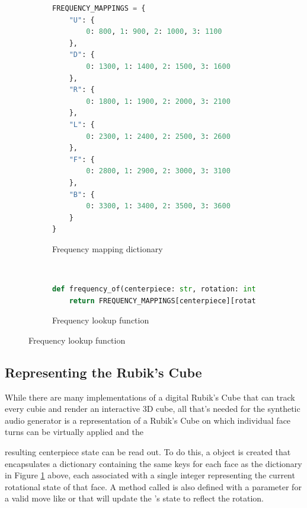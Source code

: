 \begin{figure}[h]
\caption{Centerpiece State to Frequency Mapping}
\begin{subfigure}{\textwidth}
\caption{Frequency mapping dictionary}
\label{fig:code-freq-mapping-dict}
\begin{lstlisting}[language=Python]
FREQUENCY_MAPPINGS = {
    "U": {
        0: 800, 1: 900, 2: 1000, 3: 1100
    },
    "D": {
        0: 1300, 1: 1400, 2: 1500, 3: 1600
    },
    "R": {
        0: 1800, 1: 1900, 2: 2000, 3: 2100
    },
    "L": {
        0: 2300, 1: 2400, 2: 2500, 3: 2600
    },
    "F": {
        0: 2800, 1: 2900, 2: 3000, 3: 3100
    },
    "B": {
        0: 3300, 1: 3400, 2: 3500, 3: 3600
    }
}
\end{lstlisting}
\end{subfigure}\\
\begin{subfigure}{\textwidth}
\caption{Frequency lookup function}
\label{fig:code-frequency-of}
\begin{lstlisting}[language=Python, firstnumber=last]
def frequency_of(centerpiece: str, rotation: int) -> float:
    return FREQUENCY_MAPPINGS[centerpiece][rotation]
\end{lstlisting}
\end{subfigure}
\end{figure}


\newpage
\subsection{Representing the Rubik's Cube}
\label{subsec:represent-rubiks-cube}

While there are many implementations of a digital Rubik's Cube that can
track every cubie and render an interactive 3D cube, all that's needed
for the synthetic audio generator is a representation of a Rubik's Cube
on which individual face turns can be virtually applied and the

resulting centerpiece state can be read out. To do this, a
 object is created that encapsulates a dictionary
containing the same keys for each face as the
 dictionary in Figure
\ref{fig:code-freq-mapping-dict} above, each associated with a single
integer representing the current rotational state of that face. A
method called  is also defined with a parameter for a
valid move like  or  that will update the
's state to reflect the rotation.

